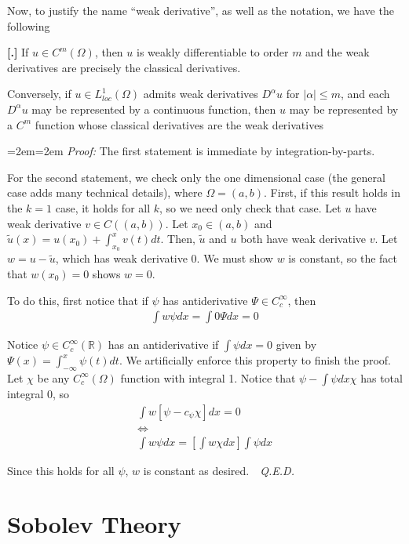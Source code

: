 \documentclass{article}
\newcommand{\R}{{\mathbb{R}}}
\newcounter{result}[section]
\newenvironment{res}[1][]{\refstepcounter{result}\par\medskip
	\noindent \textbf{[\thesection.\theresult] #1} \rmfamily}{\medskip}
\newenvironment{pf}{%
	\par%
	\medskip
	\leftskip=2em\rightskip=2em%
	\noindent\ignorespaces \textit{Proof:} \newline}{%
	\,\, \newline \textit{Q.E.D.}\par\medskip}
\begin{document}
	Now, to justify the name ``weak derivative'', as well as the notation, we have the following
	\begin{res}
		If $u \in C^{m}(\Omega)$, then $u$ is weakly differentiable to order $m$ and the weak derivatives are precisely the classical derivatives. 
		
		Conversely, if $u \in L^{1}_{loc}(\Omega)$ admits weak derivatives $D^{\alpha}u$ for $|\alpha| \leq m$, and each $D^{\alpha}u$ may be represented by a continuous function, then $u$ may be represented by a $C^{m}$ function whose classical derivatives are the weak derivatives
	\end{res}
	\begin{pf}
		The first statement is immediate by integration-by-parts. 
		
		For the second statement, we check only the one dimensional case (the general case adds many technical details), where $\Omega = (a,b)$. First, if this result holds in the $k=1$ case, it holds for all $k$, so we need only check that case. Let $u$ have weak derivative $v \in C((a,b))$. Let $x_{0} \in (a,b)$ and  $\tilde{u}(x) = u(x_0) + \int_{x_0}^{x} v(t)dt$. Then, $\tilde{u}$ and $u$ both have weak derivative $v$. Let $w = u - \tilde{u}$, which has weak derivative $0$. We must show $w$ is constant, so the fact that $w(x_0) = 0$ shows $w=0$. 
		
		To do this, first notice that if $\psi$ has antiderivative $\Psi \in C_{c}^{\infty}$, then
		\begin{align*}
			\int w \psi dx = \int 0 \Psi dx= 0
		\end{align*}
		
		Notice $\psi \in C_{c}^{\infty}(\R)$ has an antiderivative if $\int \psi dx = 0$ given by $\Psi(x) = \int_{-\infty}^{x} \psi(t)dt$. We artificially enforce this property to finish the proof. Let $\chi$ be any $C_{c}^{\infty}(\Omega)$ function with integral 1. Notice that $\psi - \int \psi dx \chi$ has total integral $0$, so 
		\begin{align*}
			\int w [\psi - c_{\psi} \chi] dx = 0 \\
			\Leftrightarrow \\
			\int w\psi dx = [\int w \chi dx] \int \psi dx
		\end{align*}
		
		Since this holds for all $\psi$, $w$ is constant as desired. 
	\end{pf}
	
	\section{Sobolev Theory}
	
\end{document}
